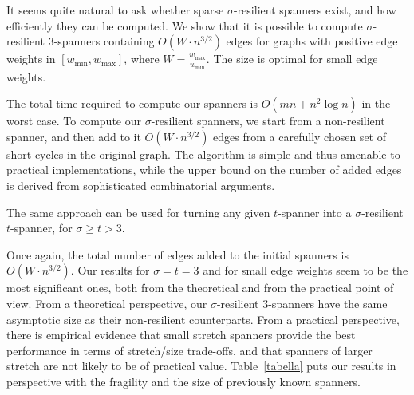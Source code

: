 \documentclass{article}
\newcommand{\commento}[1] {}
\begin{document}
It seems quite natural to ask whether
sparse $\sigma$-resilient spanners exist, and how efficiently they can be computed. 
We show that it is possible to compute $\sigma$-resilient $3$-spanners containing $O(W \cdot n^{3/2})$ edges for graphs with positive edge weights in $[w_{\mathrm{min}},w_{\mathrm{max}}]$, where $W = \frac{w_{\mathrm{max}}}{w_{\mathrm{min}}}$. The size is optimal for small edge weights. 
\commento{
In the case of unweighted graphs, in addition we are also able to compute 
(1,2)-spanners and (2,1)-spanners of optimal asymptotic size (i.e., containing $O(n^{3/2})$ edges)}
The total time required to compute our spanners is $O(mn + n^2 \log n)$ in the worst case. 
To compute our $\sigma$-resilient spanners, we start from a non-resilient spanner, and then add to it $O(W \cdot n^{3/2})$ edges from a carefully chosen set of short cycles in the original graph. The algorithm is simple and thus amenable to practical implementations, while the upper bound on the number of added edges is derived from sophisticated combinatorial arguments.

The same approach can be used for turning any given $t$-spanner into a $\sigma$-resilient $t$-spanner, for $\sigma \geq t > 3$.
\commento{, in case of weighted graphs, or for turning any given $(\alpha,\beta)$-spanner into a $\sigma$-resilient $(\alpha,\beta)$-spanner, for $\sigma \geq \alpha+\beta > 3$, in case of unweighted graphs. 
In all those cases, }
Once again, the total number of edges added to the initial spanners is $O(W \cdot n^{3/2})$.
Our results for $\sigma=t=3$ and for small edge weights seem to be the most significant ones, both from the theoretical and from the practical point of view. From a theoretical perspective, our $\sigma$-resilient $3$-spanners have the same asymptotic size as their non-resilient counterparts. From a practical perspective, there is empirical evidence \cite{ADFIR09} that small stretch spanners provide the best performance in terms of stretch/size trade-offs, and that spanners of larger stretch are not likely to be of practical value.
Table~\ref{tabella} puts our results in perspective with the fragility and the size of previously known spanners.
\end{document}
